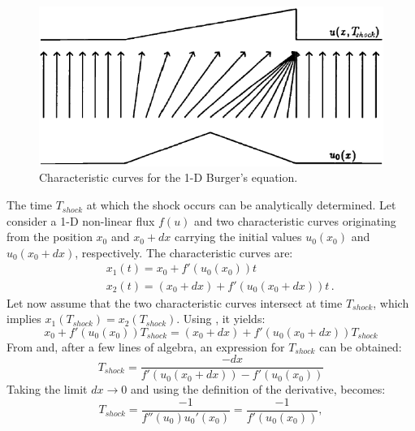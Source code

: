 %
\begin{figure}[H]
\centering
\includegraphics[width=\textwidth]{figures/shock_formation_burger.png}
\caption{Characteristic curves for the 1-D Burger's equation.}
\label{fig:char_curve_bg_sct1b}
\end{figure}
%
The time $T_{shock}$ at which the shock occurs can be analytically determined. Let consider a 1-D non-linear flux $f(u)$ and two characteristic curves originating from the position $x_0$ and $x_0+dx$ carrying the initial values $u_0(x_0)$ and $u_0(x_0+dx)$, respectively. The characteristic curves are:
%
\begin{eqnarray}\label{eq:cc1_sct1b}
&&x_1(t) = x_0 + f'(u_0(x_0)) t \nonumber \\ 
&&x_2(t) = (x_0 + dx) + f'(u_0(x_0+dx)) t \, .
\end{eqnarray}
%
Let now assume that the two characteristic curves intersect at time $T_{shock}$, which implies $x_1(T_{shock}) = x_2(T_{shock})$. Using , it yields:
%
\begin{equation}\label{eq:cc1b_sct1b}
x_0 + f'(u_0(x_0)) T_{shock} = (x_0 + dx) + f'(u_0(x_0+dx)) T_{shock}
\end{equation}
%
From  and, after a few lines of algebra, an expression for $T_{shock}$ can be obtained: 
\begin{equation}\label{eq:cc2a_sct1b}
T_{shock} = \frac{-dx}{f'(u_0(x_0+dx))-f'(u_0(x_0))}
\end{equation} 
Taking the limit $dx \to 0$ and using the definition of the derivative,  becomes:
\begin{equation}\label{eq:cc2_sct1b}
T_{shock} = \frac{-1}{f''(u_0) u_0'(x_0)} = \frac{-1}{f'(u_0(x_0))},
\end{equation} 
